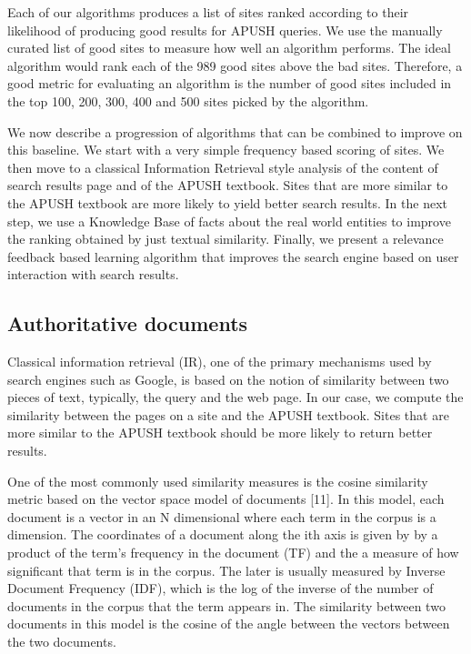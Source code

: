 \documentclass{acm_proc_article-sp}
\begin{document}
Each of our algorithms produces a list of sites ranked according to their
likelihood of producing good results for APUSH queries. We use the manually
curated list of good sites to measure how well an algorithm performs. The ideal
algorithm would rank each of the 989 good sites above the bad sites. Therefore,
a good metric for evaluating an algorithm is the number of good sites included
in the top 100, 200, 300, 400 and 500 sites picked by the algorithm. 

We now describe a progression of algorithms that can be combined to improve on
this baseline. We start with a very simple frequency based scoring of sites. We
then move to a classical Information Retrieval style analysis of the content of
search results page and of the APUSH textbook. Sites that are more similar to
the APUSH textbook are more likely to yield better search results. In the next
step, we use a Knowledge Base of facts about the real world entities to improve
the ranking obtained by just textual similarity. Finally, we present a relevance
feedback based learning algorithm that improves the search engine based on user
interaction with search results. 

\subsection{Authoritative documents}

Classical information retrieval (IR), one of the primary mechanisms used by
search engines such as Google, is based on the notion of similarity between two
pieces of text, typically, the query and the web page.  In our case, we compute
the similarity between the pages on a site and the APUSH textbook. Sites that
are more similar to the APUSH textbook should  be more likely to return better
results. 

One of the most commonly used similarity measures is the cosine similarity
metric based on the vector space model of documents [11]. In this model, each
document is a vector in an N dimensional where each term in the corpus is a
dimension. The coordinates of a document along the ith axis is given by by a
product of the term’s frequency in the document (TF) and the a measure of how
significant that term is in the corpus. The later is usually measured by Inverse
Document Frequency (IDF), which is the log of the inverse of the number of
documents in the corpus that the term appears in. The similarity between two
documents in this model is the cosine of the angle between the vectors between
the two documents. 
\end{document}
